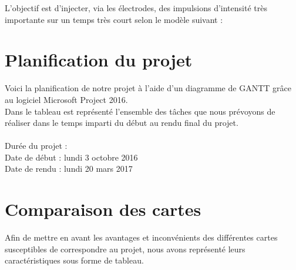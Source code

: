 \documentclass{report}
\begin{document}
\begin{center}
\end{center}

L’objectif est d’injecter, via les \'{e}lectrodes, des impulsions d’intensit\'{e} tr\`{e}s importante sur un
temps tr\`{e}s court selon le mod\`{e}le suivant : \\



\section{Planification du projet}

Voici la planification de notre projet \`{a} l’aide d’un diagramme de GANTT gr\^{a}ce au logiciel
Microsoft Project 2016.\\
Dans le tableau est repr\'{e}sent\'{e} l’ensemble des t\^{a}ches que nous pr\'{e}voyons de r\'{e}aliser dans le
temps imparti du d\'{e}but au rendu final du projet.\\ \\
Dur\'{e}e du projet : \\
Date de d\'{e}but : lundi 3 octobre 2016 \\
Date de rendu : lundi 20 mars 2017

\section{Comparaison des cartes}

Afin de mettre en avant les avantages et inconv\'{e}nients des diff\'{e}rentes cartes susceptibles de
correspondre au projet, nous avons repr\'{e}sent\'{e} leurs caract\'{e}ristiques sous forme de tableau. \\
 
\end{document}
